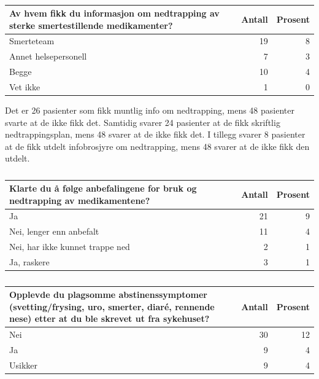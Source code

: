 \documentclass[
]{article}
\begin{document}
\begin{table}

\caption{\label{tab:opi}}
\centering
\begin{tabular}[t]{l|r|r}
\hline
Av hvem fikk du informasjon om nedtrapping av sterke smertestillende medikamenter? & Antall  & Prosent\\
\hline
Smerteteam & 19 & 8\\
\hline
Annet helsepersonell & 7 & 3\\
\hline
Begge & 10 & 4\\
\hline
Vet ikke & 1 & 0\\
\hline
\end{tabular}
\end{table}

Det er 26 pasienter som fikk muntlig info om nedtrapping, mens 48
pasienter svarte at de ikke fikk det. Samtidig svarer 24 pasienter at de
fikk skriftlig nedtrappingsplan, mens 48 svarer at de ikke fikk det. I
tillegg svarer 8 pasienter at de fikk utdelt infobrosjyre om
nedtrapping, mens 48 svarer at de ikke fikk den utdelt.

\begin{table}

\caption{\label{tab:opi}}
\centering
\begin{tabular}[t]{l|r|r}
\hline
Klarte du å følge anbefalingene for bruk og nedtrapping av medikamentene? & Antall  & Prosent\\
\hline
Ja & 21 & 9\\
\hline
Nei, lenger enn anbefalt & 11 & 4\\
\hline
Nei, har ikke kunnet trappe ned & 2 & 1\\
\hline
Ja, raskere & 3 & 1\\
\hline
\end{tabular}
\end{table}

\begin{table}

\caption{\label{tab:opi}}
\centering
\begin{tabular}[t]{l|r|r}
\hline
Opplevde du plagsomme abstinenssymptomer (svetting/frysing, uro, smerter, diaré, rennende nese) etter at du ble skrevet ut fra sykehuset? & Antall  & Prosent\\
\hline
Nei & 30 & 12\\
\hline
Ja & 9 & 4\\
\hline
Usikker & 9 & 4\\
\hline
\end{tabular}
\end{table}
\end{document}
